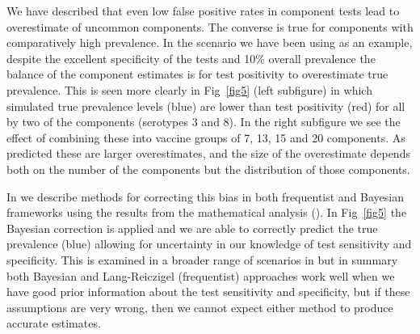 \documentclass[10pt,letterpaper]{article}
\begin{document}
We have described that even low false positive rates in component tests lead to overestimate of uncommon components. The converse is true for components with comparatively high prevalence. In the scenario we have been using as an example, despite the excellent specificity of the tests and 10\% overall prevalence the balance of the component estimates is for test positivity to overestimate true prevalence. This is seen more clearly in Fig~\ref{fig5} (left subfigure) in which simulated true prevalence levels (blue) are lower than test positivity (red) for all by two of the components (serotypes 3 and 8). In the right subfigure we see the effect of combining these into vaccine groups of 7, 13, 15 and 20 components. As predicted these are larger overestimates, and the size of the overestimate depends both on the number of the components but the distribution of those components.

In  we describe methods for correcting this bias in both frequentist and Bayesian frameworks using the results from the mathematical analysis (). In Fig~\ref{fig5} the Bayesian correction is applied and we are able to correctly predict the true prevalence (blue) allowing for uncertainty in our knowledge of test sensitivity and specificity. This is examined in a broader range of scenarios in  but in summary both Bayesian and Lang-Reiczigel (frequentist) approaches work well when we have good prior information about the test sensitivity and specificity, but if these assumptions are very wrong, then we cannot expect either method to produce accurate estimates.
\end{document}
